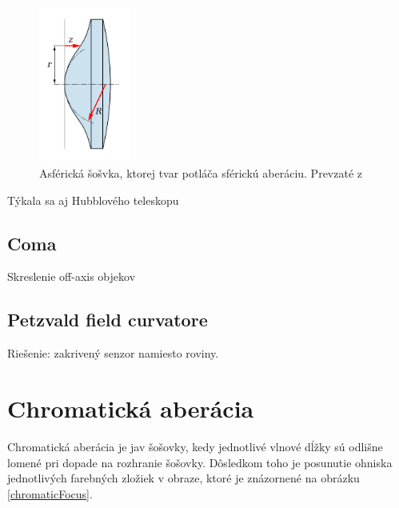 \begin{figure}[h]
\centering
\includegraphics[width=3cm]{obrazky-figures/asphericLen.png}
\caption{Asférická šošvka, ktorej tvar potláča sférickú aberáciu. Prevzaté z }
\end{figure}

Týkala sa aj Hubblového teleskopu
\subsection{Coma}
Skreslenie off-axis objekov
\subsection{Petzvald field curvatore}
Riešenie: zakrivený senzor namiesto roviny.

\section{Chromatická aberácia}
Chromatická aberácia je jav šošovky, kedy jednotlivé vlnové dĺžky sú odlišne lomené pri dopade na
rozhranie šošovky. Dôsledkom toho je posunutie ohniska jednotlivých farebných zložiek v obraze, ktoré je
znázornené na obrázku \ref{chromaticFocus}. 


